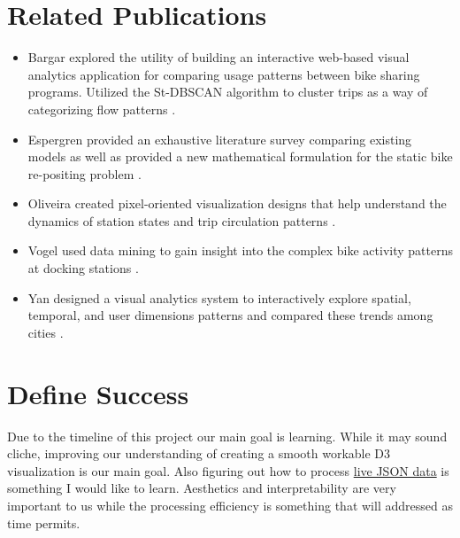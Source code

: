 \documentclass{proc}
\begin{document}
\section{Related Publications}
\begin{itemize}
  \item Bargar explored the utility of building an interactive web-based visual analytics application for comparing usage patterns between bike sharing programs. Utilized the St-DBSCAN algorithm to cluster trips as a way of categorizing flow patterns \cite{bargar2014interactive}. 
  \item Espergren provided an exhaustive literature survey comparing existing models as well as provided a new mathematical formulation for the static bike re-positing problem \cite{espegren2016static}.
  \item Oliveira created pixel-oriented visualization designs that help understand the dynamics of station states and trip circulation patterns \cite{oliveira2016visual}.
  \item Vogel used data mining to gain insight into the complex bike activity patterns at docking stations \cite{vogel2011understanding}.
  \item Yan designed a visual analytics system to interactively explore spatial, temporal, and user dimensions patterns and compared these trends among cities \cite{yan2018visual}.

\end{itemize}

\section{Define Success}

Due to the timeline of this project our main goal is learning. While it may sound cliche, improving our understanding of creating a smooth workable D3 visualization is our main goal. Also figuring out how to process \href{https://feeds.divvybikes.com/stations/stations.json}{\color{blue} live JSON data} is something I would like to learn. Aesthetics and interpretability are very important to us while the processing efficiency is something that will addressed as time permits. 



\end{document}
